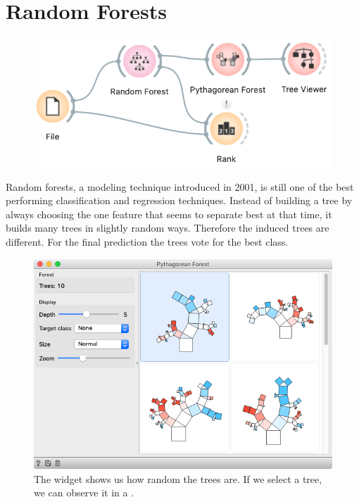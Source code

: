\chapter{Random Forests}
\label{ch:random_forests}

\begin{figure}
    \vspace{-0.5cm}
    \includegraphics[scale=0.4]{workflow.png}
\end{figure}

Random forests, a modeling technique introduced in 2001, is still one of the best performing classification and regression techniques. Instead of building a tree by always choosing the one feature that seems to separate best at that time, it builds many trees in slightly random ways. Therefore the induced trees are different. For the final prediction the trees vote for the best class.

\begin{figure}[h]
    \centering
    \includegraphics[scale=0.35]{pythagorean.png}
    \caption{The  widget shows us how random the trees are. If we select a tree, we can observe it in a .}
\end{figure}


